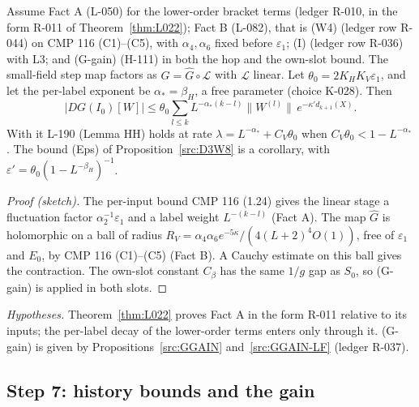 \begin{proposition}\label{src:SM}
Assume Fact A (L-050) for the lower-order bracket terms (ledger R-010, in the form R-011 of Theorem~\ref{thm:L022}); Fact B (L-082), that is (W4) (ledger row R-044) on CMP 116 (C1)--(C5), with $\alpha_4,\alpha_6$ fixed before $\varepsilon_1$; (I) (ledger row R-036) with L3; and (G-gain) (H-111) in both the hop and the own-slot bound. The small-field step map factors as $G=\hat G\circ\mathcal L$ with $\mathcal L$ linear. Let $\theta_0=2K_HK_V\varepsilon_1$, and let the per-label exponent be $\alpha_*=\beta_H$, a free parameter (choice K-028). Then
\[|DG(I_0)[W]|\le\theta_0\sum_{l\le k}L^{-\alpha_*(k-l)}\|W^{(l)}\|\,e^{-\kappa'd_{k+1}(X)}.\]
With it L-190 (Lemma HH) holds at rate $\lambda=L^{-\alpha_*}+C_V\theta_0$ when $C_V\theta_0<1-L^{-\alpha_*}$. The bound (Eps) of Proposition~\ref{src:D3W8} is a corollary, with $\varepsilon'=\theta_0(1-L^{-\beta_H})^{-1}$.
\end{proposition}
\begin{proof}[Proof (sketch)]
The per-input bound CMP 116 (1.24) gives the linear stage a fluctuation factor $\alpha_2^{-1}\varepsilon_1$ and a label weight $L^{-(k-l)}$ (Fact A). The map $\hat G$ is holomorphic on a ball of radius $R_V=\alpha_4\alpha_6e^{-5\kappa}/(4(L+2)^4O(1))$, free of $\varepsilon_1$ and $E_0$, by CMP 116 (C1)--(C5) (Fact B). A Cauchy estimate on this ball gives the contraction. The own-slot constant $C_\beta$ has the same $1/g$ gap as $S_0$, so (G-gain) is applied in both slots.
\end{proof}
\emph{Hypotheses.} Theorem~\ref{thm:L022} proves Fact A in the form R-011 relative to its inputs; the per-label decay of the lower-order terms enters only through it. (G-gain) is given by Propositions~\ref{src:GGAIN} and~\ref{src:GGAIN-LF} (ledger R-037).

\subsection{Step 7: history bounds and the gain}\label{sec:src-B13}

